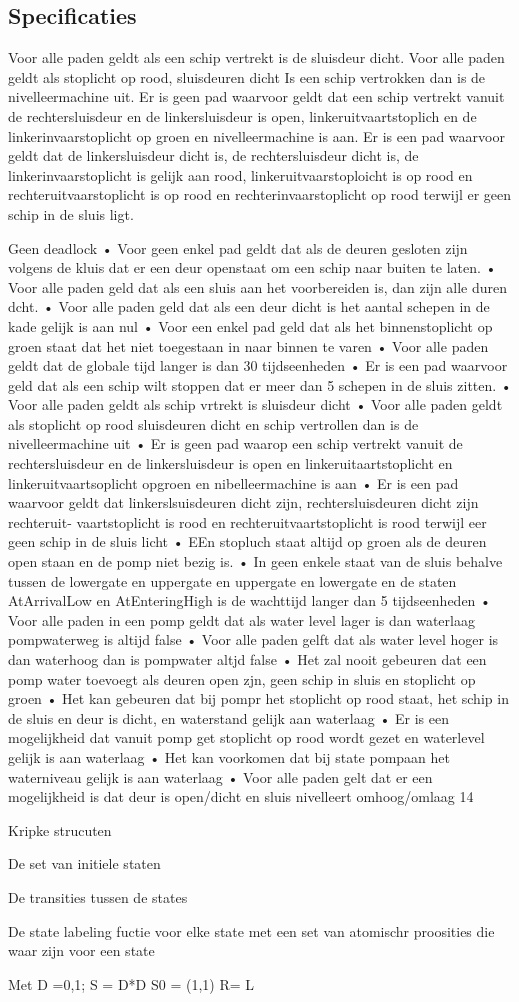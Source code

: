\subsection{Specificaties}

Voor alle paden geldt als een schip vertrekt is de sluisdeur dicht. 
Voor alle paden geldt als stoplicht op rood, sluisdeuren dicht 
Is een schip vertrokken dan is de nivelleermachine uit. 
Er is geen pad waarvoor geldt dat een schip vertrekt vanuit de rechtersluisdeur en de linkersluisdeur is open, linkeruitvaartstoplich en de linkerinvaarstoplicht op groen en nivelleermachine is aan. 
Er is een pad waarvoor geldt dat de linkersluisdeur dicht is, de rechtersluisdeur dicht is, de linkerinvaarstoplicht is gelijk aan rood, linkeruitvaarstoploicht is op rood en rechteruitvaarstoplicht is op rood en rechterinvaarstoplicht op rood terwijl er geen schip in de sluis ligt. 

Geen deadlock 
• Voor geen enkel pad geldt dat als de deuren gesloten zijn volgens de kluis dat er een deur openstaat om 
een schip naar buiten te laten. 
• Voor alle paden geld dat als een sluis aan het voorbereiden is, dan zijn alle duren dcht. 
• Voor alle paden geld dat als een deur dicht is het aantal schepen in de kade gelijk is aan nul 
• Voor een enkel pad geld dat als het binnenstoplicht op groen staat dat het niet toegestaan in naar binnen 
te varen 
• Voor alle paden geldt dat de globale tijd langer is dan 30 tijdseenheden 
• Er is een pad waarvoor geld dat als een schip wilt stoppen dat er meer dan 5 schepen in de sluis zitten. 
• Voor alle paden geldt als schip vrtrekt is sluisdeur dicht 
• Voor alle paden geldt als stoplicht op rood sluisdeuren dicht en schip vertrollen dan is de nivelleermachine 
uit 
• Er is geen pad waarop een schip vertrekt vanuit de rechtersluisdeur en de linkersluisdeur is open en 
linkeruitaartstoplicht en linkeruitvaartsoplicht opgroen en nibelleermachine is aan 
• Er is een pad waarvoor geldt dat linkerslsuisdeuren dicht zijn, rechtersluisdeuren dicht zijn rechteruit- 
vaartstoplicht is rood en rechteruitvaartstoplicht is rood terwijl eer geen schip in de sluis licht 
• EEn stopluch staat altijd op groen als de deuren open staan en de pomp niet bezig is. 
• In geen enkele staat van de sluis behalve tussen de lowergate en uppergate en uppergate en lowergate en 
de staten AtArrivalLow en AtEnteringHigh is de wachttijd langer dan 5 tijdseenheden 
• Voor alle paden in een pomp geldt dat als water level lager is dan waterlaag pompwaterweg is altijd false 
• Voor alle paden gelft dat als water level hoger is dan waterhoog dan is pompwater altjd false 
• Het zal nooit gebeuren dat een pomp water toevoegt als deuren open zjn, geen schip in sluis en stoplicht 
op groen 
• Het kan gebeuren dat bij pompr het stoplicht op rood staat, het schip in de sluis en deur is dicht, en 
waterstand gelijk aan waterlaag 
• Er is een mogelijkheid dat vanuit pomp get stoplicht op rood wordt gezet en waterlevel gelijk is aan 
waterlaag 
• Het kan voorkomen dat bij state pompaan het waterniveau gelijk is aan waterlaag 
• Voor alle paden gelt dat er een mogelijkheid is dat deur is open/dicht en sluis nivelleert omhoog/omlaag 
14 




Kripke strucuten


De set van initiele staten

De transities tussen de states

De state labeling fuctie voor elke state met een set van atomischr proosities die waar zijn voor een state

Met D ={0,1};
S = D*D
S0 = {(1,1)}
R=
L

